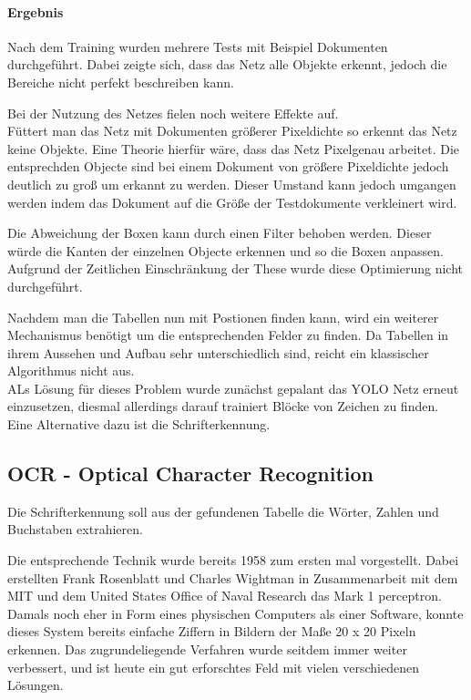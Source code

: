 \documentclass[
]{article}
\begin{document}
\hypertarget{header-n144}{%
\paragraph{Ergebnis}\label{header-n144}}

Nach dem Training wurden mehrere Tests mit Beispiel Dokumenten
durchgeführt. Dabei zeigte sich, dass das Netz alle Objekte erkennt,
jedoch die Bereiche nicht perfekt beschreiben kann.

Bei der Nutzung des Netzes fielen noch weitere Effekte auf. \\
Füttert man das Netz mit Dokumenten größerer Pixeldichte so erkennt das
Netz keine Objekte. Eine Theorie hierfür wäre, dass das Netz Pixelgenau
arbeitet. Die entsprechden Objecte sind bei einem Dokument von größere
Pixeldichte jedoch deutlich zu groß um erkannt zu werden. Dieser Umstand
kann jedoch umgangen werden indem das Dokument auf die Größe der
Testdokumente verkleinert wird.

Die Abweichung der Boxen kann durch einen Filter behoben werden. Dieser
würde die Kanten der einzelnen Objecte erkennen und so die Boxen
anpassen. Aufgrund der Zeitlichen Einschränkung der These wurde diese
Optimierung nicht durchgeführt.

Nachdem man die Tabellen nun mit Postionen finden kann, wird ein
weiterer Mechanismus benötigt um die entsprechenden Felder zu finden. Da
Tabellen in ihrem Aussehen und Aufbau sehr unterschiedlich sind, reicht
ein klassischer Algorithmus nicht aus. \\
ALs Lösung für dieses Problem wurde zunächst gepalant das YOLO Netz
erneut einzusetzen, diesmal allerdings darauf trainiert Blöcke von
Zeichen zu finden. Eine Alternative dazu ist die Schrifterkennung.

\hypertarget{header-n149}{%
\subsection{OCR - Optical Character Recognition}\label{header-n149}}

Die Schrifterkennung soll aus der gefundenen Tabelle die Wörter, Zahlen
und Buchstaben extrahieren.

Die entsprechende Technik wurde bereits 1958 zum ersten mal vorgestellt.
Dabei erstellten Frank Rosenblatt und Charles Wightman in Zusammenarbeit
mit dem MIT und dem United States Office of Naval Research das Mark 1
perceptron. Damals noch eher in Form eines physischen Computers als
einer Software, konnte dieses System bereits einfache Ziffern in Bildern
der Maße 20 x 20 Pixeln erkennen. Das zugrundeliegende Verfahren wurde
seitdem immer weiter verbessert, und ist heute ein gut erforschtes Feld
mit vielen verschiedenen Lösungen.
\end{document}
